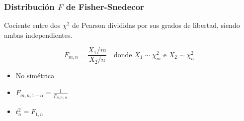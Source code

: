 \documentclass[a4paper,12pt]{article}
\newcommand{\ecuacion}[1]{\ensuremath{#1}}
\begin{document}
\subsubsection{Distribución \ecuacion{F} de Fisher-Snedecor}

Cociente entre dos \ecuacion{\chi^2} de Pearson divididas por sus grados de libertad, siendo ambas independientes.

\begin{equation}
    F_{m,n} = \frac{X_1/m}{X_2/n} \quad \text{donde } X_1 \sim \chi^2_m \text{ e } X_2 \sim \chi^2_n
\end{equation}

\begin{itemize}
    \item No simétrica
    \item \ecuacion{F_{m,n,1-\alpha} = \frac{1}{F_{n,m,\alpha}}}
    \item \ecuacion{t^2_n = F_{1,n}}
\end{itemize}







    


\end{document}
